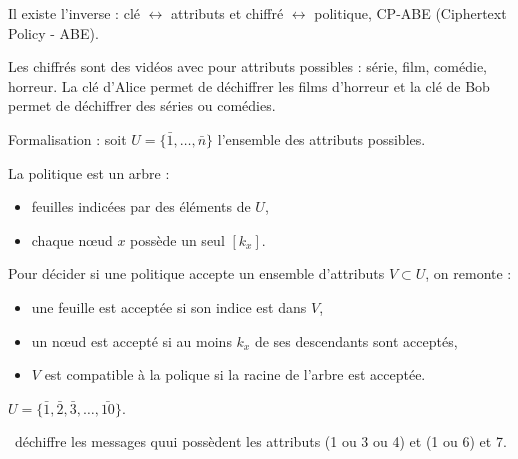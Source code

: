 	\begin{rem}
		Il existe l'inverse : clé $\leftrightarrow$ attributs et chiffré $\leftrightarrow$ politique, CP-ABE (Ciphertext Policy - ABE).
	\end{rem}
	
	\begin{ex}
		Les chiffrés sont des vidéos avec pour attributs possibles : série, film, comédie, horreur.
		La clé d'Alice permet de déchiffrer les films d'horreur et la clé de Bob permet de déchiffrer des séries ou comédies.
	\end{ex}
	
	Formalisation : soit $U = \{ \bar 1, \ldots, \bar n \}$ l'ensemble des attributs possibles.
	
	La politique est un arbre :
	\begin{itemize}
		\item[\textbullet] feuilles indicées par des éléments de $U$,
		\item[\textbullet] chaque nœud $x$ possède un seul $[k_x]$.
	\end{itemize}
	
	Pour décider si une politique accepte un ensemble d'attributs $V \subset U$, on remonte :
	\begin{itemize}
		\item[\textbullet] une feuille est acceptée si son indice est dans $V$,
		\item[\textbullet] un nœud est accepté si au moins $k_x$ de ses descendants sont acceptés,
		\item[\textbullet] $V$ est compatible à la polique si la racine de l'arbre est acceptée.
	\end{itemize}
	
	\begin{ex}
		$U = \{ \bar 1, \bar 2, \bar 3, \ldots, \bar{10} \}$.
		
		\begin{center}
		\end{center}

	\textrightarrow\ déchiffre les messages quui possèdent les attributs (1 ou 3 ou 4) et (1 ou 6) et 7.
	\end{ex}
	
